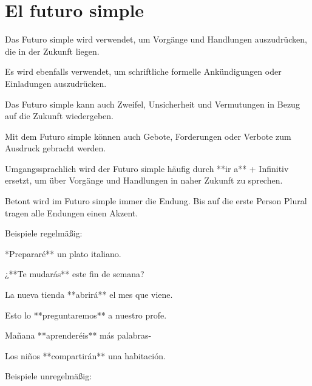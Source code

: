 \section*{El futuro simple}

\begin{highlight}
Das Futuro simple wird verwendet, um Vorgänge und Handlungen auszudrücken, die in der Zukunft liegen.

Es wird ebenfalls verwendet, um schriftliche formelle Ankündigungen oder Einladungen auszudrücken.

Das Futuro simple kann auch Zweifel, Unsicherheit und Vermutungen in Bezug auf die Zukunft wiedergeben.

Mit dem Futuro simple können auch Gebote, Forderungen oder Verbote zum Ausdruck gebracht werden.
\end{highlight}

\begin{hint}
Umgangssprachlich wird der Futuro simple häufig durch **ir a** + Infinitiv ersetzt, um über Vorgänge und Handlungen
in naher Zukunft zu sprechen.
\end{hint}

\begin{hint}
Betont wird im Futuro simple immer die Endung. Bis auf die erste Person Plural tragen alle Endungen einen Akzent.
\end{hint}

Beispiele regelmäßig:

\begin{compactitem}
    \item **Prepararé** un plato italiano.
    \item  ¿**Te mudarás** este fin de semana?
    \item  La nueva tienda **abrirá** el mes que viene.
    \item  Esto lo **preguntaremos** a nuestro profe.
    \item  Mañana **aprenderéis** más palabras-
    \item  Los niños **compartirán** una habitación.
\end{compactitem}

Beispiele unregelmäßig:

